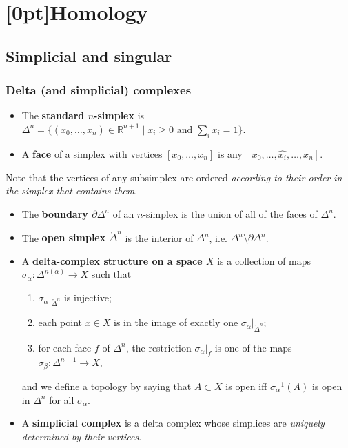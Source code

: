 \documentclass[10pt]{article}
\newcommand{\rr}{\mathbb{R}}
\newcommand{\remove}[1]{\widehat{#1}}
\newcommand{\interior}[1]{\mathring{#1}}
\newcommand{\AT}{\textcolor{violet}{AT}}
\begin{document}
    \section{\protect\marginnote{\AT}[0pt]Homology}

        \subsection{Simplicial and singular}

            \subsubsection{Delta (and simplicial) complexes}

                \begin{itemize}
                    \item The \textbf{standard $n$-simplex} is $\Delta^n=\{(x_0,\ldots,x_n)\in\rr^{n+1} \mid x_i\geqslant0\text{ and }\sum_i x_i=1\}$.
                    \item A \textbf{face} of a simplex with vertices $[x_0,\ldots,x_n]$ is any $[x_0,\ldots,\remove{x_i},\ldots,x_n]$.
                \end{itemize}

                Note that the vertices of any subsimplex are ordered \emph{according to their order in the simplex that contains them}.

                \begin{itemize}
                    \item The \textbf{boundary $\partial\Delta^n$} of an $n$-simplex is the union of all of the faces of $\Delta^n$.
                    \item The \textbf{open simplex $\interior{\Delta}^n$} is the interior of $\Delta^n$, i.e. $\Delta^n\setminus\partial\Delta^n$.
                    \item A \textbf{delta-complex structure on a space $X$} is a collection of maps $\sigma_\alpha\colon\Delta^{n(\alpha)}\to X$ such that
                        \begin{enumerate}
                            \item $\sigma_\alpha|_{\interior{\Delta}^n}$ is injective;
                            \item each point $x\in X$ is in the image of exactly one $\sigma_\alpha|_{\interior{\Delta}^n}$;
                            \item for each face $f$ of $\Delta^n$, the restriction $\sigma_\alpha|_f$ is one of the maps $\sigma_\beta\colon\Delta^{n-1}\to X$,
                        \end{enumerate}
                        and we define a topology by saying that $A\subset X$ is open iff $\sigma_\alpha^{-1}(A)$ is open in $\Delta^n$ for all $\sigma_\alpha$.
                    \item A \textbf{simplicial complex} is a delta complex whose simplices are \emph{uniquely determined by their vertices}.
                \end{itemize}
\end{document}
